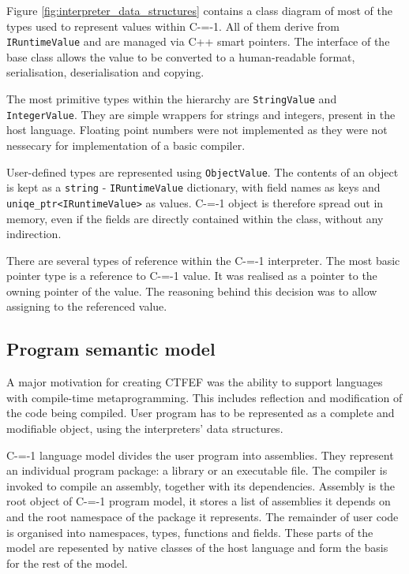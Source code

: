 Figure \ref{fig:interpreter_data_structures} contains a class diagram of most of the types used to represent values within C-=-1.
All of them derive from \lstinline{IRuntimeValue} and are managed via C++ smart pointers.
The interface of the base class allows the value to be converted to a human-readable format, serialisation, deserialisation and copying.

The most primitive types within the hierarchy are \lstinline{StringValue} and \lstinline{IntegerValue}.
They are simple wrappers for strings and integers, present in the host language.
Floating point numbers were not implemented as they were not nessecary for implementation of a basic compiler.

User-defined types are represented using \lstinline{ObjectValue}.
The contents of an object is kept as a \lstinline{string} - \lstinline{IRuntimeValue} dictionary, with field names as keys and \lstinline{uniqe_ptr<IRuntimeValue>} as values.
C-=-1 object is therefore spread out in memory, even if the fields are directly contained within the class, without any indirection.


There are several types of reference within the C-=-1 interpreter.
The most basic pointer type is a reference to C-=-1 value.
It was realised as a pointer to the owning pointer of the value.
The reasoning behind this decision was to allow assigning to the referenced value.

\subsection{Program semantic model}
\label{semantic_model}

A major motivation for creating CTFEF was the ability to support languages with compile-time metaprogramming.
This includes reflection and modification of the code being compiled.
User program has to be represented as a complete and modifiable object, using the interpreters' data structures.

C-=-1 language model divides the user program into assemblies.
They represent an individual program package: a library or an executable file.
The compiler is invoked to compile an assembly, together with its dependencies.
Assembly is the root object of C-=-1 program model, it stores a list of assemblies it depends on and the root namespace of the package it represents.
The remainder of user code is organised into namespaces, types, functions and fields.
These parts of the model are repesented by native classes of the host language and form the basis for the rest of the model.

